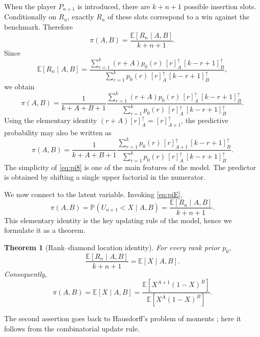 \documentclass[11pt,reqno]{amsart}
\newtheorem{theorem}{Theorem}[section]
\theoremstyle{definition}
\theoremstyle{remark}
\numberwithin{equation}{section}
\begin{document}
When the player \(P_{n+1}\) is introduced, there are \(k+n+1\) possible insertion slots. Conditionally on \(R_n\), exactly \(R_n\) of these slots correspond to a win against the benchmark. Therefore
\begin{equation}\label{eq:piE}
\pi(A,B)=\frac{\mathbb{E}[R_n\mid A,B]}{k+n+1}.
\end{equation}
Since
\[
\mathbb{E}[R_n\mid A,B]=\frac{\sum_{r=1}^k(r+A)p_0(r)\,[r]_A^\uparrow\,[k-r+1]_B^\uparrow}{\sum_{r=1}^k p_0(r)\,[r]_A^\uparrow\,[k-r+1]_B^\uparrow},
\]
we obtain
\begin{equation}\label{eq:pi}
\pi(A,B)=\frac1{k+A+B+1}\frac{\sum_{r=1}^k(r+A)p_0(r)\,[r]_A^\uparrow\,[k-r+1]_B^\uparrow}{\sum_{r=1}^k p_0(r)\,[r]_A^\uparrow\,[k-r+1]_B^\uparrow}.
\end{equation}
Using the elementary identity \((r+A)[r]_A^\uparrow=[r]_{A+1}^\uparrow\), the predictive probability may also be written as
\begin{equation}\label{eq:pi8}
\pi(A,B)=\frac1{k+A+B+1}\frac{\sum_{r=1}^k p_0(r)\,[r]_{A+1}^\uparrow\,[k-r+1]_B^\uparrow}{\sum_{r=1}^k p_0(r)\,[r]_A^\uparrow\,[k-r+1]_B^\uparrow}.
\end{equation}
The simplicity of \eqref{eq:pi8} is one of the main features of the model. The predictor is obtained by shifting a single upper factorial in the numerator.

We now connect to the latent variable. Invoking \eqref{eq:piE},
\begin{equation}\label{eq:piX}
\pi(A,B)=\mathbb{P}(U_{n+1}<X\mid A,B)=\frac{\mathbb{E}[R_n\mid A,B]}{k+n+1}.
\end{equation}
This elementary identity is the key updating rule of the model, hence we formulate it as a theorem.

\begin{theorem}[Rank--diamond location identity]
For every rank prior \(p_0\),
\begin{equation}\label{eq:identity}
\frac{\mathbb{E}[R_n\mid A,B]}{k+n+1}=\mathbb{E}[X\mid A,B].
\end{equation}
Consequently,
\begin{equation}\label{eq:moments}
\pi(A,B)=\mathbb{E}[X\mid A,B]=\frac{\mathbb{E}[X^{A+1}(1-X)^B]}{\mathbb{E}[X^A(1-X)^B]}.
\end{equation}
\end{theorem}

The second assertion goes back to Hausdorff's problem of moments \cite{Hausdorff1921a,Hausdorff1921b}; here it follows from the combinatorial update rule.
\end{document}
